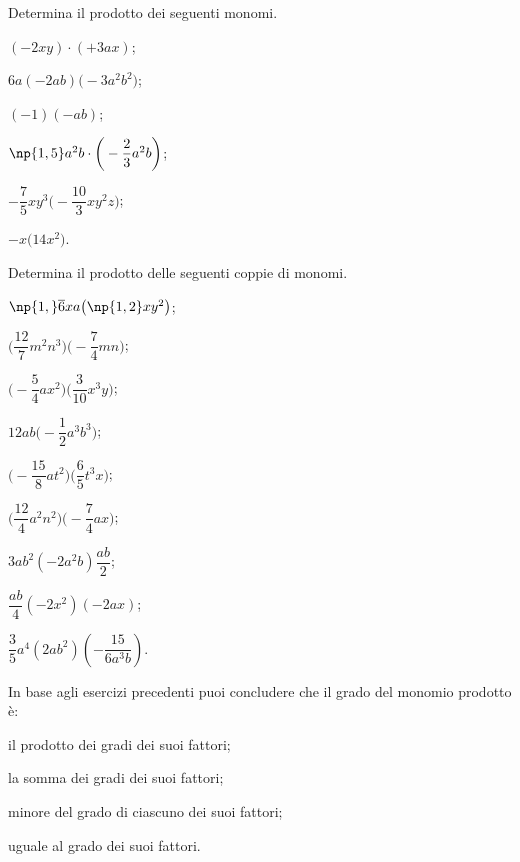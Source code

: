 \begin{esercizio}[\Ast]
 \label{ese:10.13} %
Determina il prodotto dei seguenti monomi.
\begin{multicols}{3}
\begin{enumeratea}
\spazielenx
 \item $(-2xy)\cdot (+3ax)$;
 \item $6a(-2ab)\big(-3a^{2}b^{2}\big)$;
 \item $(-1)(-ab)$;
 \item $\np{1,5}a^{2}b\cdot \bigg(-{\dfrac{2}{3}}a^{2}b\bigg)$;
 \item $-{\dfrac{7}{5}}xy^{3}\bigg(-{\dfrac{10}{3}}xy^{2}z\bigg)$;
 \item $-x\big(14x^{2}\big)$.
\end{enumeratea}
\end{multicols}
\end{esercizio}
\pagebreak
\begin{esercizio}[\Ast]
 \label{ese:10.14} %
Determina il prodotto delle seguenti coppie di monomi.
\begin{multicols}{3}
\begin{enumeratea}
 \item $\np{1,}\overline{{6}}xa\big(\np{1,2}xy^{2}\big)$;
 \item $\bigg(\dfrac{12}{7}m^{2}n^{3}\bigg)\bigg(-{\dfrac{7}{4}}mn\bigg)$;
 \item $\bigg(-{\dfrac{5}{4}}ax^{2}\bigg)\bigg(\dfrac{3}{10}x^{3}y\bigg)$;
 \item $12ab\bigg(-{\dfrac{1}{2}}a^{3}b^{3}\bigg)$;
 \item $\bigg(-{\dfrac{15}{8}}at^{2}\bigg)\bigg(\dfrac{6}{5}t^{3}x\bigg)$;
 \item $\bigg(\dfrac{12}{4}a^{2}n^{2}\bigg)\bigg(-{\dfrac{7}{4}}ax\bigg)$;
 \item $3ab^2\left(-2a^2b\right)\dfrac{ab}{2}$;
 \item $\dfrac{ab}{4}\left(-2x^2\right)(-2ax)$;
 \item $\dfrac{3}{5}a^4\left({2ab^2}\right)\left(-\dfrac{15}{6a^3b}\right)$.
\end{enumeratea}
\end{multicols}
\end{esercizio}


\begin{esercizio}[\Ast]
 \label{ese:10.15} %
In base agli esercizi precedenti puoi concludere che il grado del monomio prodotto è:

\begin{enumeratea}
 \item il prodotto dei gradi dei suoi fattori;
 \item la somma dei gradi dei suoi fattori;
 \item minore del grado di ciascuno dei suoi fattori;
 \item uguale al grado dei suoi fattori.
\end{enumeratea}
\end{esercizio}

